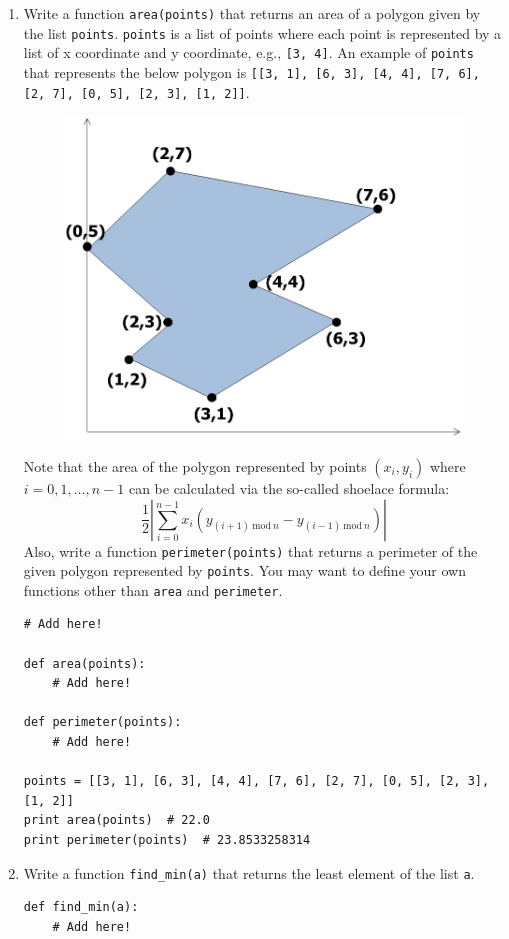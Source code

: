 \documentclass[../main.tex]{subfiles}
\begin{document}
\begin{enumerate}
\item Write a function \texttt{area(points)} that returns an area of a polygon given by the list \texttt{points}.
\texttt{points} is a list of points where each point is represented by a list of x coordinate and y coordinate, e.g., \texttt{[3, 4]}.
An example of \texttt{points} that represents the below polygon is \texttt{[[3, 1], [6, 3], [4, 4], [7, 6], [2, 7], [0, 5], [2, 3], [1, 2]]}.
\begin{figure}[H]
\centering
\includegraphics[width=0.5\linewidth]{"./lectures/lecture4_q6"}
\label{fig:lecture4q6}
\end{figure}
Note that the area of the polygon represented by points $(x_i, y_i)$ where $i = 0, 1, \dots, n - 1$ can be calculated via the so-called shoelace formula:
\[
\frac 12 \left| \sum_{i = 0}^{n - 1} x_i \left(y_{(i + 1)\ \mathrm{mod}\ n} - y_{(i - 1)\ \mathrm{mod}\ n}\right)\right|
\]
Also, write a function \texttt{perimeter(points)} that returns a perimeter of the given polygon represented by \texttt{points}.
You may want to define your own functions other than \texttt{area} and \texttt{perimeter}.
\begin{verbatim}
# Add here!

def area(points):
    # Add here!

def perimeter(points):
    # Add here!

points = [[3, 1], [6, 3], [4, 4], [7, 6], [2, 7], [0, 5], [2, 3], [1, 2]]
print area(points)  # 22.0
print perimeter(points)  # 23.8533258314
\end{verbatim}

\item Write a function \texttt{find\_min(a)} that returns the least element of the list \texttt{a}.
\begin{verbatim}
def find_min(a):
    # Add here!


\end{verbatim}
\end{enumerate}
\end{document}
